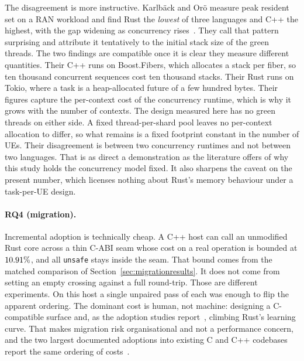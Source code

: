 \documentclass[english,oneside,a4paper,censored,csm,software-track-2020]{HYthesisML}
\begin{document}
The disagreement is more instructive. Karlb\"ack and Or\"o measure peak resident set on a RAN
workload and find Rust the \emph{lowest} of three languages and C++ the highest, with the gap
widening as concurrency rises~\cite{karlback2021ran}. They call that pattern surprising and
attribute it tentatively to the initial stack size of the green threads. The two findings are
compatible once it is clear they measure different quantities. Their C++ runs on Boost.Fibers,
which allocates a stack per fiber, so ten thousand concurrent sequences cost ten thousand stacks.
Their Rust runs on Tokio, where a task is a heap-allocated future of a few hundred bytes. Their
figures capture the per-context cost of the concurrency runtime, which is why it grows with the
number of contexts. The design measured here has no green threads on either side. A fixed
thread-per-shard pool leaves no per-context allocation to differ, so what remains is a fixed
footprint constant in the number of UEs. Their disagreement is between two concurrency runtimes and
not between two languages. That is as direct a demonstration as the literature offers of why this
study holds the concurrency model fixed. It also sharpens the caveat on the present number,
which licenses nothing about Rust's memory behaviour under a task-per-UE design.

\paragraph{RQ4 (migration).} Incremental adoption is technically cheap. A C++ host can call an
unmodified Rust core across a thin C-ABI seam whose cost on a real operation is bounded at
$10.91\%$, and all \texttt{unsafe} stays inside the seam. That bound comes from the matched comparison of Section~\ref{sec:migrationresults}. It does
not come from setting an empty crossing against a full round-trip. Those are different
experiments. On this host a single unpaired pass of each was enough to flip the apparent
ordering. The dominant cost is human, not machine: designing
a C-compatible surface and, as the adoption studies
report~\cite{fulton2021adopting,crichton2024learning}, climbing Rust's learning curve. That makes
migration risk organisational and not a performance concern, and the two largest documented
adoptions into existing C and C++ codebases report the same ordering of
costs~\cite{li2026rustlinux,fan2026android}.
\end{document}
